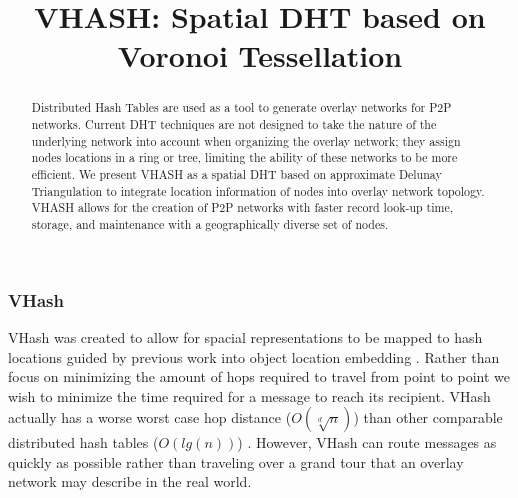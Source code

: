 \documentclass{article}
\title{VHASH: Spatial DHT based on Voronoi Tessellation}
\date{} %
\begin{document}



\maketitle
\vspace*{-0.55in}
\begin{abstract}
Distributed Hash Tables are used as a tool to generate overlay networks for P2P networks. Current DHT techniques are not designed to take the nature of the underlying network into account when organizing the overlay network; they assign nodes locations in a ring or tree, limiting the ability of these networks to be more efficient. We present VHASH as a spatial DHT based on approximate Delunay Triangulation to integrate location information of nodes into overlay network topology. VHASH allows for the creation of P2P networks with faster record look-up time, storage, and maintenance with a geographically diverse set of nodes.
\end{abstract}



\subsubsection*{VHash}
VHash was created to allow for spacial representations to be mapped to hash locations guided by previous work into object location embedding \citep{voronet}. Rather than focus on minimizing the amount of hops required to travel from point to point we wish to minimize the time required for a message to reach its recipient. VHash actually has a worse worst case hop distance ($O(\sqrt[d]{n})$) than other comparable distributed hash tables ($O(lg(n))$) \citep{chord}. However, VHash can route messages as quickly as possible rather than traveling over a grand tour that an overlay network may describe in the real world.

\end{document}
